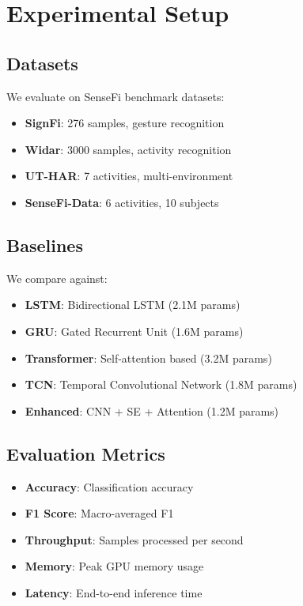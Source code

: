 \documentclass[10pt,conference]{IEEEtran}
\begin{document}
\section{Experimental Setup}
\label{sec:experiments}

\subsection{Datasets}

We evaluate on SenseFi benchmark datasets:
\begin{itemize}
    \item \textbf{SignFi}: 276 samples, gesture recognition
    \item \textbf{Widar}: 3000 samples, activity recognition
    \item \textbf{UT-HAR}: 7 activities, multi-environment
    \item \textbf{SenseFi-Data}: 6 activities, 10 subjects
\end{itemize}

\subsection{Baselines}

We compare against:
\begin{itemize}
    \item \textbf{LSTM}: Bidirectional LSTM (2.1M params)
    \item \textbf{GRU}: Gated Recurrent Unit (1.6M params)
    \item \textbf{Transformer}: Self-attention based (3.2M params)
    \item \textbf{TCN}: Temporal Convolutional Network (1.8M params)
    \item \textbf{Enhanced}: CNN + SE + Attention (1.2M params)
\end{itemize}

\subsection{Evaluation Metrics}

\begin{itemize}
    \item \textbf{Accuracy}: Classification accuracy
    \item \textbf{F1 Score}: Macro-averaged F1
    \item \textbf{Throughput}: Samples processed per second
    \item \textbf{Memory}: Peak GPU memory usage
    \item \textbf{Latency}: End-to-end inference time
\end{itemize}
\end{document}
